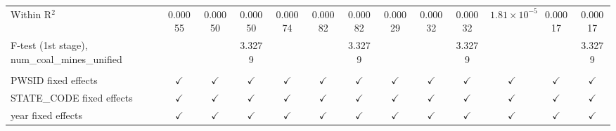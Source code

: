 \begin{table}[htbp]
\begin{adjustbox}{width = \textwidth, center}
\begin{tabular}{lcccccccccccc}
         Within R$^2$                                     & 0.00055       & 0.00050       & 0.00050       & 0.00074       & 0.00082       & 0.00082       & 0.00029       & 0.00032       & 0.00032       & $1.81\times 10^{-5}$  & 0.00017       & 0.00017\\  
         F-test (1st stage), num\_coal\_mines\_unified    &               &               & 3.3279        &               &               & 3.3279        &               &               & 3.3279        &                       &               & 3.3279\\  
          \\
         PWSID fixed effects                              & $\checkmark$  & $\checkmark$  & $\checkmark$  & $\checkmark$  & $\checkmark$  & $\checkmark$  & $\checkmark$  & $\checkmark$  & $\checkmark$  & $\checkmark$          & $\checkmark$  & $\checkmark$\\   
         STATE\_CODE fixed effects                        & $\checkmark$  & $\checkmark$  & $\checkmark$  & $\checkmark$  & $\checkmark$  & $\checkmark$  & $\checkmark$  & $\checkmark$  & $\checkmark$  & $\checkmark$          & $\checkmark$  & $\checkmark$\\   
         year fixed effects                               & $\checkmark$  & $\checkmark$  & $\checkmark$  & $\checkmark$  & $\checkmark$  & $\checkmark$  & $\checkmark$  & $\checkmark$  & $\checkmark$  & $\checkmark$          & $\checkmark$  & $\checkmark$\\   
         \bottomrule
      \end{tabular}
   \end{adjustbox}
\end{table}


